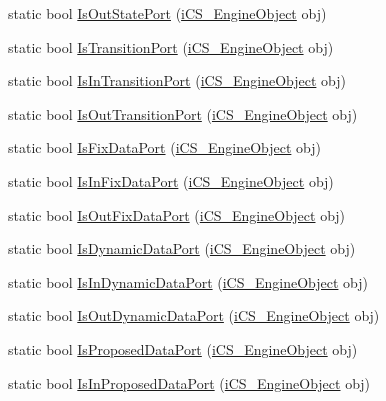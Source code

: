 \begin{DoxyCompactItemize}
\item 
static bool \hyperlink{classi_c_s___object_type_a5a8782f966b9458767bc0c3751c39869}{Is\+Out\+State\+Port} (\hyperlink{classi_c_s___engine_object}{i\+C\+S\+\_\+\+Engine\+Object} obj)
\item 
static bool \hyperlink{classi_c_s___object_type_ab685865b847cb43b4a25a593901d9dbb}{Is\+Transition\+Port} (\hyperlink{classi_c_s___engine_object}{i\+C\+S\+\_\+\+Engine\+Object} obj)
\item 
static bool \hyperlink{classi_c_s___object_type_ababf1b1de279bc8db60e1af1932e3001}{Is\+In\+Transition\+Port} (\hyperlink{classi_c_s___engine_object}{i\+C\+S\+\_\+\+Engine\+Object} obj)
\item 
static bool \hyperlink{classi_c_s___object_type_a53b68985ea053004a60bf971dd1589f5}{Is\+Out\+Transition\+Port} (\hyperlink{classi_c_s___engine_object}{i\+C\+S\+\_\+\+Engine\+Object} obj)
\item 
static bool \hyperlink{classi_c_s___object_type_a4d392583aeb9a00747a34a49d5515bfd}{Is\+Fix\+Data\+Port} (\hyperlink{classi_c_s___engine_object}{i\+C\+S\+\_\+\+Engine\+Object} obj)
\item 
static bool \hyperlink{classi_c_s___object_type_ad543ead056e7a208ba1562818ee8e23f}{Is\+In\+Fix\+Data\+Port} (\hyperlink{classi_c_s___engine_object}{i\+C\+S\+\_\+\+Engine\+Object} obj)
\item 
static bool \hyperlink{classi_c_s___object_type_a7e0beb7f03bd52f0a1486ba6c8df906e}{Is\+Out\+Fix\+Data\+Port} (\hyperlink{classi_c_s___engine_object}{i\+C\+S\+\_\+\+Engine\+Object} obj)
\item 
static bool \hyperlink{classi_c_s___object_type_ad622e67019be3987afa66c8042110865}{Is\+Dynamic\+Data\+Port} (\hyperlink{classi_c_s___engine_object}{i\+C\+S\+\_\+\+Engine\+Object} obj)
\item 
static bool \hyperlink{classi_c_s___object_type_aee5160dc218f42801d2a1f0f76454db3}{Is\+In\+Dynamic\+Data\+Port} (\hyperlink{classi_c_s___engine_object}{i\+C\+S\+\_\+\+Engine\+Object} obj)
\item 
static bool \hyperlink{classi_c_s___object_type_ae023d19eb3d1bba2495d307d04dbc884}{Is\+Out\+Dynamic\+Data\+Port} (\hyperlink{classi_c_s___engine_object}{i\+C\+S\+\_\+\+Engine\+Object} obj)
\item 
static bool \hyperlink{classi_c_s___object_type_acbc92e0bc025f048c65ec4d7dceee86f}{Is\+Proposed\+Data\+Port} (\hyperlink{classi_c_s___engine_object}{i\+C\+S\+\_\+\+Engine\+Object} obj)
\item 
static bool \hyperlink{classi_c_s___object_type_a84896682fb2e6a84617a7617a29dc9c6}{Is\+In\+Proposed\+Data\+Port} (\hyperlink{classi_c_s___engine_object}{i\+C\+S\+\_\+\+Engine\+Object} obj)

\end{DoxyCompactItemize}
